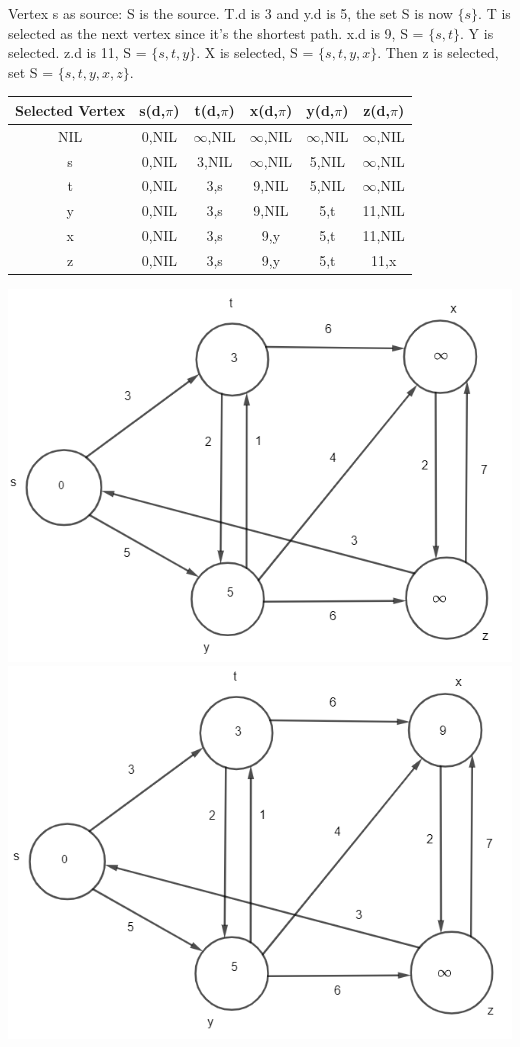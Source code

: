 \documentclass[12pt]{article}
\begin{document}
\begin{enumerate}
Vertex s as source:
S is the source. T.d is 3 and y.d is 5, the set S is now $\{s\}$. T is selected as the next vertex since it's the shortest path. x.d is 9, S = $\{s,t\}$. Y is selected. z.d is 11, S = $\{s,t,y\}$. X is selected, S = $\{s,t,y,x\}$. Then z is selected, set S = $\{s,t,y,x,z\}$.\\
\begin{center}
 \begin{tabular}{|c|c c c c c|} 
 \hline
 Selected Vertex & s(d,$\pi$) & t(d,$\pi$) & x(d,$\pi$) & y(d,$\pi$) & z(d,$\pi$)\\ [0.5ex] 
 \hline
 NIL & 0,NIL &  $\infty$,NIL & $\infty$,NIL & $\infty$,NIL & $\infty$,NIL\\ 
 \hline
 s & 0,NIL & 3,NIL & $\infty$,NIL & 5,NIL & $\infty$,NIL\\ 
 \hline
 t & 0,NIL & 3,s & 9,NIL & 5,NIL & $\infty$,NIL \\
 \hline
 y & 0,NIL & 3,s & 9,NIL & 5,t & 11,NIL \\
 \hline
 x & 0,NIL & 3,s & 9,y & 5,t & 11,NIL \\
 \hline
 z & 0,NIL & 3,s & 9,y & 5,t & 11,x \\
 \hline
\end{tabular}
\end{center}
\includegraphics[scale=.65]{24.3-1 Vertex S/1-1.png}\\
\includegraphics[scale=.65]{24.3-1 Vertex S/1-2.png}\\

\end{enumerate}
\end{document}
